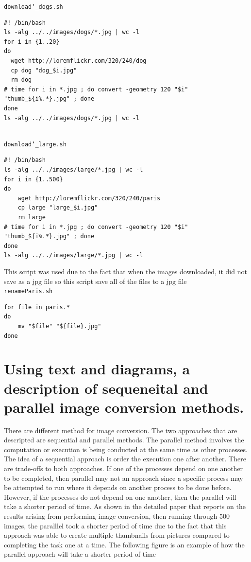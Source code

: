 \documentclass{article}
\begin{document}
\texttt{download\char`_dogs.sh}
\begin{lstlisting}
#! /bin/bash
ls -alg ../../images/dogs/*.jpg | wc -l
for i in {1..20}
do
  wget http://loremflickr.com/320/240/dog
  cp dog "dog_$i.jpg"
  rm dog
# time for i in *.jpg ; do convert -geometry 120 "$i" "thumb_${i%.*}.jpg" ; done
done
ls -alg ../../images/dogs/*.jpg | wc -l


\end{lstlisting}
\texttt{download\char`_large.sh}
\begin{lstlisting}
#! /bin/bash
ls -alg ../../images/large/*.jpg | wc -l
for i in {1..500}
do
	wget http://loremflickr.com/320/240/paris
	cp large "large_$i.jpg"
	rm large
# time for i in *.jpg ; do convert -geometry 120 "$i" "thumb_${i%.*}.jpg" ; done
done
ls -alg ../../images/large/*.jpg | wc -l
\end{lstlisting}
This script was used due to the fact that when the images downloaded, it did not save as a jpg file so this script save all of the files to a jpg file
\\
\texttt{renameParis.sh}
\begin{lstlisting}
for file in paris.*
do
	mv "$file" "${file}.jpg"
done
\end{lstlisting}


\section{Using text and diagrams, a description of sequeneital and parallel image conversion methods.}

There are different method for image conversion. The two approaches that are descripted are sequential and parallel methods. The parallel method involves the computation or execution is being conducted at the same time as other processes. The idea of a sequential approach is order the execution one after another. There are trade-offs to both approaches. If one of the processes depend on one another to be completed, then parallel may not an approach since a specific process may be attempted to run where it depends on another process to be done before. However, if the processes do not depend on one another, then the parallel will take a shorter period of time. As shown in the detailed paper that reports on the results arising from performing image conversion, then running through 500 images, the paralllel took a shorter period of time due to the fact that this approach was able to create multiple thumbnails from pictures compared to completing the task one at a time. The following figure is an example of how the parallel approach will take a shorter period of time \cite{parallel_boundary_domain_integral_method}
\end{document}
